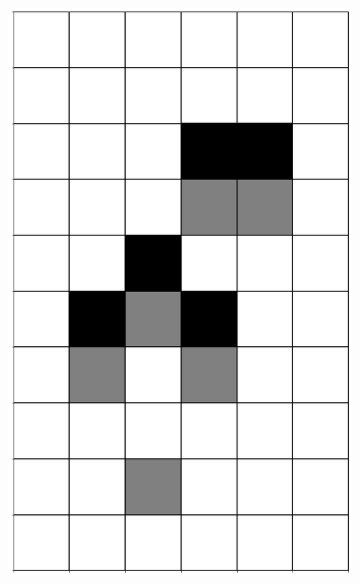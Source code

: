\documentclass[12pt]{article}
\numberwithin{figure}{section} %
\begin{document}
\begin{figure}[H]
\begin{subfigure}{0.3\textwidth}
     \includegraphics[angle=270,width=\linewidth]{Section4/3.1}
     \subcaption{}
   \end{subfigure}
        \begin{subfigure}{0.3\textwidth}
     \centering

\end{subfigure}
\end{figure}
\end{document}

